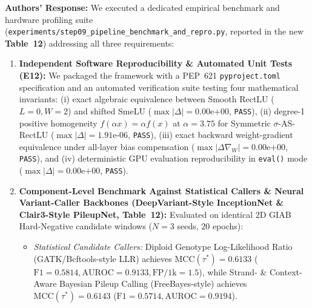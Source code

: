 \documentclass[11pt,a4paper]{article}
\newcommand{\authorsresponse}{\noindent\textbf{Authors' Response: }}
\begin{document}
\authorsresponse We executed a dedicated empirical benchmark and hardware profiling suite (\texttt{experiments/step09\_pipeline\_benchmark\_and\_repro.py}, reported in the new \textbf{Table~12}) addressing all three requirements:
\begin{enumerate}
    \item \textbf{Independent Software Reproducibility \& Automated Unit Tests (E12):} We packaged the framework with a PEP~621 \texttt{pyproject.toml} specification and an automated verification suite testing four mathematical invariants: (i) exact algebraic equivalence between Smooth RectLU ($L=0, W=2$) and shifted SmeLU ($\max |\Delta| = 0.00\text{e+}00$, \texttt{PASS}), (ii) degree-1 positive homogeneity $f(\alpha x) = \alpha f(x)$ at $\alpha = 3.75$ for Symmetric $\sigma$-AS-RectLU ($\max |\Delta| = 1.91\text{e-}06$, \texttt{PASS}), (iii) exact backward weight-gradient equivalence under all-layer bias compensation ($\max |\Delta \nabla_W| = 0.00\text{e+}00$, \texttt{PASS}), and (iv) deterministic GPU evaluation reproducibility in \texttt{eval()} mode ($\max |\Delta| = 0.00\text{e+}00$, \texttt{PASS}).
    \item \textbf{Component-Level Benchmark Against Statistical Callers \& Neural Variant-Caller Backbones (DeepVariant-Style InceptionNet \& Clair3-Style PileupNet, Table~12):} Evaluated on identical 2D GIAB Hard-Negative candidate windows ($N=3$ seeds, 20 epochs):
    \begin{itemize}
        \item \textit{Statistical Candidate Callers:} Diploid Genotype Log-Likelihood Ratio (GATK/Bcftools-style LLR) achieves $\text{MCC}(\tau^*) = 0.6133$ ($\text{F1} = 0.5814, \text{AUROC} = 0.9133, \text{FP/1k} = 1.5$), while Strand- \& Context-Aware Bayesian Pileup Calling (FreeBayes-style) achieves $\text{MCC}(\tau^*) = 0.6143$ ($\text{F1} = 0.5714, \text{AUROC} = 0.9194$).

\end{itemize}
\end{enumerate}
\end{document}
